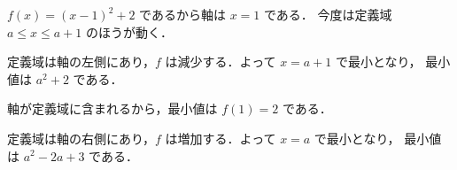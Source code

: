 \documentclass[lualatex,paper=b5j,fontsize=10pt,twoside]{jlreq}
\begin{document}
\begin{mmproblems}
  \item $f(x)=(x-1)^2+2$ であるから軸は $x=1$ である．
    今度は定義域 $a\leq x\leq a+1$ のほうが動く．

    定義域は軸の左側にあり，$f$ は減少する．よって $x=a+1$ で最小となり，
    最小値は $a^2+2$ である．

    軸が定義域に含まれるから，最小値は $f(1)=2$ である．

    定義域は軸の右側にあり，$f$ は増加する．よって $x=a$ で最小となり，
    最小値は $a^2-2a+3$ である．
\end{mmproblems}
\end{document}
